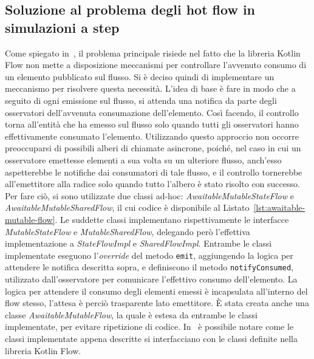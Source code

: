 \documentclass[12pt,a4paper,openright,twoside]{book}
\begin{document}
\subsection{Soluzione al problema degli hot flow in simulazioni a step}
Come spiegato in~, il problema principale risiede nel fatto che la libreria Kotlin Flow non mette a disposizione meccanismi per controllare l'avvenuto consumo di un elemento pubblicato sul flusso. Si è deciso quindi di implementare un meccanismo per risolvere questa necessità. 
L'idea di base è fare in modo che a seguito di ogni emissione sul flusso, si attenda una notifica da parte degli osservatori dell'avvenuta consumazione dell'elemento. Così facendo, il controllo torna all'entità che ha emesso sul flusso solo quando tutti gli osservatori hanno effettivamente consumato l'elemento. Utilizzando questo approccio non occorre preoccuparsi di possibili alberi di chiamate asincrone, poiché, nel caso in cui un osservatore emettesse elementi a sua volta su un ulteriore flusso, anch'esso aspetterebbe le notifiche dai consumatori di tale flusso, e il controllo tornerebbe all'emettitore alla radice solo quando tutto l'albero è stato risolto con successo.
Per fare ciò, si sono utilizzate due classi ad-hoc: \textit{AwaitableMutableStateFlow} e \textit{AwaitableMutableSharedFlow}, il cui codice è disponibile al Listato~\ref{lst:awaitable-mutable-flow}. Le suddette classi implementano rispettivamente le interfacce \textit{MutableStateFlow} e \textit{MutableSharedFlow}, delegando però l'effettiva implementazione a \textit{StateFlowImpl} e \textit{SharedFlowImpl}. Entrambe le classi implementate eseguono l'\textit{override} del metodo \texttt{emit}, aggiungendo la logica per attendere le notifica descritta sopra, e definiscono il metodo \texttt{notifyConsumed}, utilizzato dall'osservatore per comunicare l'effettivo consumo dell'elemento. La logica per attendere il consumo degli elementi emessi è incapsulata all'interno del flow stesso, l'attesa è perciò trasparente lato emettitore. È stata creata anche una classe \textit{AwaitableMutableFlow}, la quale è estesa da entrambe le classi implementate, per evitare ripetizione di codice. 
In~ è possibile notare come le classi implementate appena descritte si interfacciano con le classi definite nella libreria Kotlin Flow. 
\end{document}

